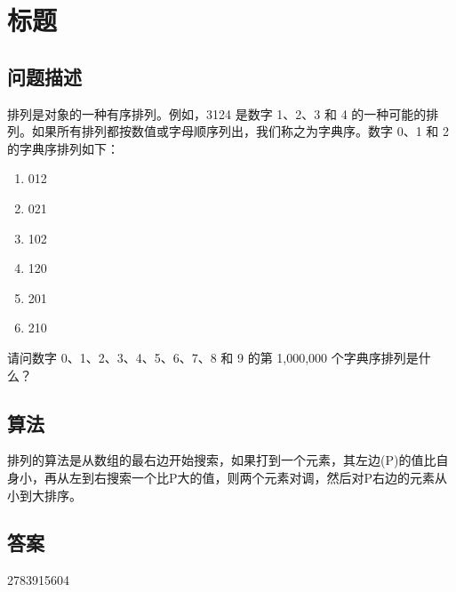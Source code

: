 \section{标题}
\subsection{问题描述}
\begin{tcolorbox}
排列是对象的一种有序排列。例如，3124 是数字 1、2、3 和 4 的一种可能的排列。如果所有排列都按数值或字母顺序列出，我们称之为字典序。数字 0、1 和 2 的字典序排列如下：

\begin{enumerate}
  \item 012
  \item 021
  \item 102
  \item 120
  \item 201
  \item 210
\end{enumerate}

请问数字 0、1、2、3、4、5、6、7、8 和 9 的第 1,000,000 个字典序排列是什么？
\end{tcolorbox}

\subsection{算法}
排列的算法是从数组的最右边开始搜索，如果打到一个元素，其左边(P)的值比自身小，再从左到右搜索一个比P大的值，则两个元素对调，然后对P右边的元素从小到大排序。

\subsection{答案}
2783915604
